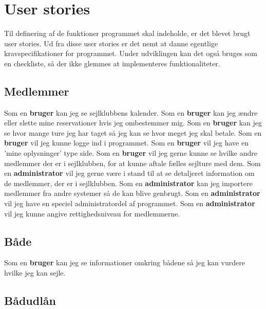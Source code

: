 \section{User stories}
Til definering af de funktioner programmet skal indeholde, er det blevet brugt user stories. 
Ud fra disse user stories er det nemt at danne egentlige kravspecifikationer for programmet. 
Under udviklingen kan det også bruges som en checkliste, så der ikke glemmes at implementeres funktionaliteter. 

\subsection{Medlemmer}
Som en \textbf{bruger} kan jeg se sejlklubbens kalender.
\newline
Som en \textbf{bruger} kan jeg ændre eller slette mine reservationer hvis jeg ombestemmer mig.
\newline
Som en \textbf{bruger} kan jeg se hvor mange ture jeg har taget så jeg kan se hvor meget jeg skal betale.
\newline
Som en \textbf{bruger} vil jeg kunne logge ind i programmet.
\newline
Som en \textbf{bruger} vil jeg have en 'mine oplysninger' type side.
\newline
Som en \textbf{bruger} vil jeg gerne kunne se hvilke andre medlemmer der er i sejlklubben, for at kunne aftale fælles sejlture med dem.
\newline
Som en \textbf{administrator} vil jeg gerne være i stand til at se detaljeret information om de medlemmer, der er i sejlklubben.
\newline
Som en \textbf{administrator} kan jeg importere medlemmer fra andre systemer så de kan blive genbrugt.
\newline
Som en \textbf{administrator} vil jeg have en speciel administratordel af programmet.
\newline
Som en \textbf{administrator} vil jeg kunne angive rettighedsniveau for medlemmerne.

\subsection{Både}

Som en \textbf{bruger} kan jeg se informationer omkring bådene så jeg kan vurdere hvilke jeg kan sejle.

\subsection{Bådudlån}

